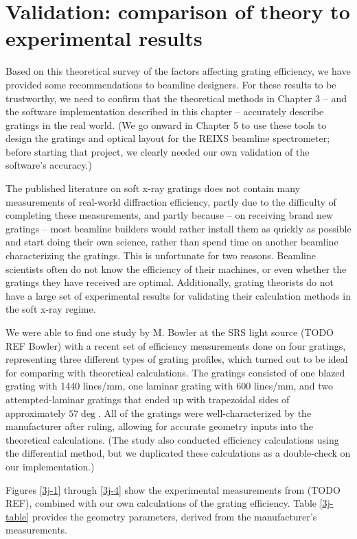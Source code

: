 \section{Validation: comparison of theory to experimental results}
Based on this theoretical survey of the factors affecting grating efficiency, we have provided some recommendations to beamline designers.  For these results to be trustworthy, we need to confirm that the theoretical methods in Chapter 3 -- and the software implementation described in this chapter -- accurately describe gratings in the real world.  (We go onward in Chapter 5 to use these tools to design the gratings and optical layout for the REIXS beamline spectrometer; before starting that project, we clearly needed our own validation of the software's accuracy.)

The published literature on soft x-ray gratings does not contain many measurements of real-world diffraction efficiency, partly due to the difficulty of completing these measurements, and partly because -- on receiving brand new gratings -- most beamline builders would rather install them as quickly as possible and start doing their own science, rather than spend time on another beamline characterizing the gratings.  This is unfortunate for two reasons.  Beamline scientists often do not know the efficiency of their machines, or even whether the gratings they have received are optimal. Additionally, grating theorists do not have a large set of experimental results for validating their calculation methods in the soft x-ray regime.

 We were able to find one study by M. Bowler at the SRS light source (TODO REF Bowler) with a recent set of efficiency measurements done on four gratings, representing three different types of grating profiles, which turned out to be ideal for comparing with theoretical calculations.  The gratings consisted of one blazed grating with 1440 lines/mm, one laminar grating with 600 lines/mm, and two attempted-laminar gratings that ended up with trapezoidal sides of approximately $57\deg$.  All of the gratings were well-characterized by the manufacturer after ruling, allowing for accurate geometry inputs into the theoretical calculations.  (The study also conducted efficiency calculations  using the differential method, but we duplicated these calculations as a double-check on our implementation.)

Figures \ref{3j-1} through \ref{3j-4} show the experimental measurements from (TODO REF), combined with our own calculations of the grating efficiency.  Table \ref{3j-table} provides the geometry parameters, derived from the manufacturer's measurements.

